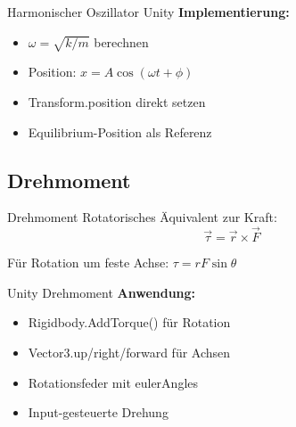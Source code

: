 \begin{concept}{Harmonischer Oszillator Unity}
    \textbf{Implementierung:}
    \begin{itemize}
        \item $\omega = \sqrt{k/m}$ berechnen
        \item Position: $x = A\cos(\omega t + \phi)$
        \item Transform.position direkt setzen
        \item Equilibrium-Position als Referenz
    \end{itemize}
\end{concept}

\subsection{Drehmoment}

\begin{definition}{Drehmoment}
    Rotatorisches Äquivalent zur Kraft:
    $$\vec{\tau} = \vec{r} \times \vec{F}$$
    
    Für Rotation um feste Achse: $\tau = rF\sin\theta$
\end{definition}

\begin{concept}{Unity Drehmoment}
    \textbf{Anwendung:}
    \begin{itemize}
        \item Rigidbody.AddTorque() für Rotation
        \item Vector3.up/right/forward für Achsen
        \item Rotationsfeder mit eulerAngles
        \item Input-gesteuerte Drehung
    \end{itemize}
\end{concept}


